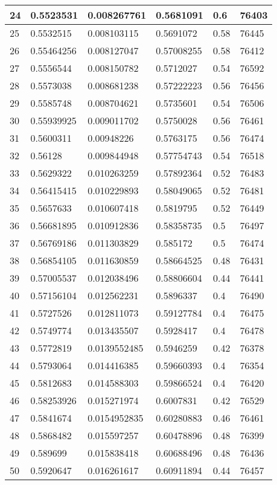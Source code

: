 \begin{longtable}{|l|l|l|l|l|l|}
24 & 0.5523531 & 0.008267761 & 0.5681091 & 0.6 & 76403 \\ \hline 
25 & 0.5532515 & 0.008103115 & 0.5691072 & 0.58 & 76445 \\ \hline 
26 & 0.55464256 & 0.008127047 & 0.57008255 & 0.58 & 76412 \\ \hline 
27 & 0.5556544 & 0.008150782 & 0.5712027 & 0.54 & 76592 \\ \hline 
28 & 0.5573038 & 0.008681238 & 0.57222223 & 0.56 & 76456 \\ \hline 
29 & 0.5585748 & 0.008704621 & 0.5735601 & 0.54 & 76506 \\ \hline 
30 & 0.55939925 & 0.009011702 & 0.5750028 & 0.56 & 76461 \\ \hline 
31 & 0.5600311 & 0.00948226 & 0.5763175 & 0.56 & 76474 \\ \hline 
32 & 0.56128 & 0.009844948 & 0.57754743 & 0.54 & 76518 \\ \hline 
33 & 0.5629322 & 0.010263259 & 0.57892364 & 0.52 & 76483 \\ \hline 
34 & 0.56415415 & 0.010229893 & 0.58049065 & 0.52 & 76481 \\ \hline 
35 & 0.5657633 & 0.010607418 & 0.5819795 & 0.52 & 76449 \\ \hline 
36 & 0.56681895 & 0.010912836 & 0.58358735 & 0.5 & 76497 \\ \hline 
37 & 0.56769186 & 0.011303829 & 0.585172 & 0.5 & 76474 \\ \hline 
38 & 0.56854105 & 0.011630859 & 0.58664525 & 0.48 & 76431 \\ \hline 
39 & 0.57005537 & 0.012038496 & 0.58806604 & 0.44 & 76441 \\ \hline 
40 & 0.57156104 & 0.012562231 & 0.5896337 & 0.4 & 76490 \\ \hline 
41 & 0.5727526 & 0.012811073 & 0.59127784 & 0.4 & 76475 \\ \hline 
42 & 0.5749774 & 0.013435507 & 0.5928417 & 0.4 & 76478 \\ \hline 
43 & 0.5772819 & 0.0139552485 & 0.5946259 & 0.42 & 76378 \\ \hline 
44 & 0.5793064 & 0.014416385 & 0.59660393 & 0.4 & 76354 \\ \hline 
45 & 0.5812683 & 0.014588303 & 0.59866524 & 0.4 & 76420 \\ \hline 
46 & 0.58253926 & 0.015271974 & 0.6007831 & 0.42 & 76529 \\ \hline 
47 & 0.5841674 & 0.0154952835 & 0.60280883 & 0.46 & 76461 \\ \hline 
48 & 0.5868482 & 0.015597257 & 0.60478896 & 0.48 & 76399 \\ \hline 
49 & 0.589699 & 0.015838418 & 0.60688496 & 0.48 & 76436 \\ \hline 
50 & 0.5920647 & 0.016261617 & 0.60911894 & 0.44 & 76457 \\ \hline 
\end{longtable}